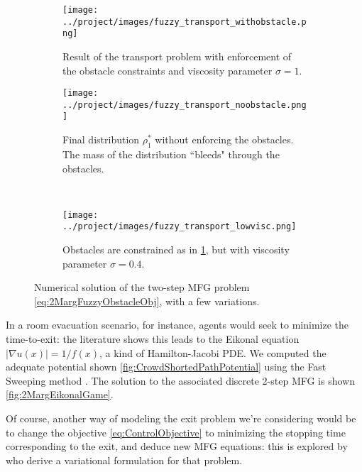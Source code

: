 \documentclass[../report.tex]{subfiles}
\begin{document}
\begin{figure}[h]
	\centering
	\begin{subfigure}[t]{.70\linewidth}
	\texttt{[image: ../project/images/fuzzy\_transport\_withobstacle.png]}
	\caption{Result of the transport problem with enforcement of the obstacle constraints and viscosity parameter $\sigma=1$.}\label{fig:2MargFuzzyTransportObstacles}
	\end{subfigure}
	\begin{subfigure}[t]{.34\linewidth}
	\centering
	\texttt{[image: ../project/images/fuzzy\_transport\_noobstacle.png]}
	\caption{Final distribution $\rho^*_1$ without enforcing the obstacles. The mass of the distribution ``bleeds" through the obstacles. }\label{fig:2MargFuzzyTransportRelaxedObst}
	\end{subfigure}~
	\begin{subfigure}[t]{.34\linewidth}
	\centering
	\texttt{[image: ../project/images/fuzzy\_transport\_lowvisc.png]}
	\caption{Obstacles are constrained as in \cref{fig:2MargFuzzyTransportObstacles}, but with viscosity parameter $\sigma=0.4$.}\label{fig:2MargFuzzyTransportLowVisc}
	\end{subfigure}
	\caption{Numerical solution of the two-step MFG problem \eqref{eq:2MargFuzzyObstacleObj}, with a few variations.}\label{fig:2MargFuzzyTransportMarginals}
\end{figure}

\begin{remark}\label{rem:SmartPotential}
In a room evacuation scenario, for instance, agents would seek to minimize the time-to-exit: the literature shows this leads to the Eikonal equation $|\nabla u(x)| = 1/f(x)$, a kind of Hamilton-Jacobi PDE. We computed the adequate potential shown \cref{fig:CrowdShortedPathPotential} using the Fast Sweeping method \parencite{Zhao2004AFS}. The solution to the associated discrete 2-step MFG is shown \cref{fig:2MargEikonalGame}.

Of course, another way of modeling the exit problem we're considering would be to change the objective \eqref{eq:ControlObjective} to minimizing the stopping time corresponding to the exit, and deduce new MFG equations: this is explored by \textcite{benamou:hal-01295299} who derive a variational formulation for that problem.
\end{remark}
\end{document}
